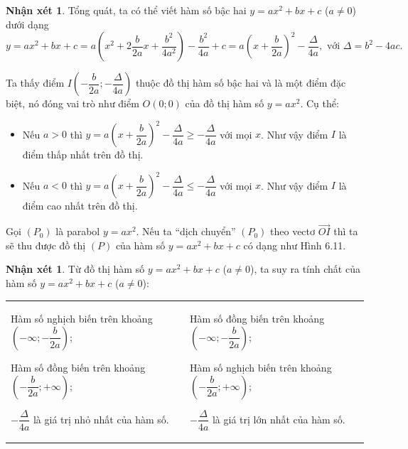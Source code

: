 \documentclass[12pt,a4paper,oneside]{book}
\theoremstyle{theorem}
\theoremstyle{definition}
\newtheorem{nx}[theorem2]{Nhận xét}
\begin{document}
        \begin{nx}
Tổng quát, ta có thể viết hàm số bậc hai $y = ax^2 + bx + c$ ($a \neq 0$) dưới dạng
$$y = ax^2 + bx + c = a\left(x^2 + 2\dfrac{b}{2a}x + \dfrac{b^2}{4a^2}\right) - \dfrac{b^2}{4a} + c = a\left(x + \dfrac{b}{2a}\right)^2 - \dfrac{\Delta}{4a}, \text{ với } \Delta = b^2 - 4ac.$$

Ta thấy điểm $I\left(-\dfrac{b}{2a}; -\dfrac{\Delta}{4a}\right)$ thuộc đồ thị hàm số bậc hai và là một điểm đặc biệt, nó đóng vai trò như điểm $O(0; 0)$ của đồ thị hàm số $y = ax^2$. Cụ thể:
\begin{itemize}
    \item Nếu $a > 0$ thì $y = a\left(x + \dfrac{b}{2a}\right)^2 - \dfrac{\Delta}{4a} \geq -\dfrac{\Delta}{4a}$ với mọi $x$. Như vậy điểm $I$ là điểm thấp nhất trên đồ thị.
    \item Nếu $a < 0$ thì $y = a\left(x + \dfrac{b}{2a}\right)^2 - \dfrac{\Delta}{4a} \leq -\dfrac{\Delta}{4a}$ với mọi $x$. Như vậy điểm $I$ là điểm cao nhất trên đồ thị.
\end{itemize}

Gọi $(P_0)$ là parabol $y = ax^2$. Nếu ta ``dịch chuyển'' $(P_0)$ theo vectơ $\overrightarrow{OI}$ thì ta sẽ thu được đồ thị $(P)$ của hàm số $y = ax^2 + bx + c$ có dạng như Hình 6.11.
        \end{nx}
        \begin{nx}
         Từ đồ thị hàm số $y = ax^2 + bx + c$ ($a \neq 0$), ta suy ra tính chất của hàm số $y = ax^2 + bx + c$ ($a \neq 0$):

\vspace{0.3cm}

\begin{center}
\begin{tabular}{|p{7cm}|p{7cm}|}
    \hline
    \centering{Với $a > 0$} & \centering{Với $a < 0$} \tabularnewline %
    \hline
    Hàm số nghịch biến trên khoảng $\left(-\infty; -\dfrac{b}{2a}\right)$;
    
    \vspace{0.2cm}
    Hàm số đồng biến trên khoảng $\left(-\dfrac{b}{2a}; +\infty\right)$;
    
    \vspace{0.2cm}
    $-\dfrac{\Delta}{4a}$ là giá trị nhỏ nhất của hàm số.
    & 
    Hàm số đồng biến trên khoảng $\left(-\infty; -\dfrac{b}{2a}\right)$;
    
    \vspace{0.2cm}
    Hàm số nghịch biến trên khoảng $\left(-\dfrac{b}{2a}; +\infty\right)$;
    
    \vspace{0.2cm}
    $-\dfrac{\Delta}{4a}$ là giá trị lớn nhất của hàm số.
    \vspace{0.2cm}
    \tabularnewline
    \hline
\end{tabular}
\end{center}
        \end{nx}
\end{document}
